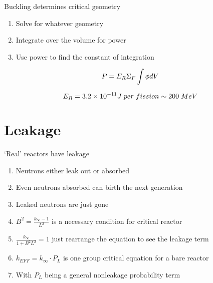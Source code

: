 \documentclass[aspectratio=1610,pdftex,dvipsnames,compress,xcolor={dvipsnames}]{beamer}
\begin{document}
\begin{frame}{Buckling determines critical geometry}
    \begin{enumerate}[series=outerlist,topsep=0pt,itemsep=21pt,leftmargin=*,label=(\arabic*)]
        \item[]Solve for whatever geometry
        \item[]Integrate over the volume for power
        \item[]Use power to find the constant of integration
    \end{enumerate}

    \vspace*{\fill}

    \begin{equation}
        \LARGE
        P = E_R \Sigma_F \int \phi dV
    \end{equation}

    \begin{equation}
        \LARGE
        E_R = 3.2 \times 10^{-11} J \; per \; fission \sim 200 \; MeV
    \end{equation}
\end{frame}


\section{Leakage}


\addtocounter{framenumber}{-1} 
\begin{frame}{`Real' reactors have leakage }
    \begin{enumerate}[series=outerlist,topsep=0pt,itemsep=21pt,leftmargin=*,label=(\arabic*)]
        \item[]Neutrons either leak out or absorbed
        \item[]Even neutrons absorbed can birth the next generation
        \item[]Leaked neutrons are just gone
        \item[]$B^2 = \frac{k_\infty - 1}{L^2}$ is a necessary condition for critical reactor
        \item[]$\frac{k_\infty}{1+B^2L^2}=1$ just rearrange the equation to see the leakage term
        \item[]$k_{EFF} = k_{\infty} \cdot P_L$ is one group critical equation for a bare reactor
        \item[]With $P_L$ being a general nonleakage probability term
    \end{enumerate}
\end{frame}
\end{document}
